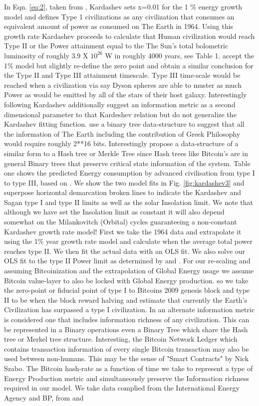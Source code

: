 \documentclass[final,5p,times,twocolumn,authoryear]{elsarticle}
\begin{document}
In Eqn. \ref{eq:2}, taken from \cite{kar64}, Kardashev sets x=0.01 for the 1 \% energy growth model and defines Type 1 civilizations as any civilization that consumes an equivalent amount of power as consumed on The Earth in 1964. Using  this growth rate Kardashev proceeds to calculate that Human civilization would reach Type II or the Power attainment equal to the The Sun's total bolometric luminosity of roughly 3.9 X $10^{26}$ W in roughly 4000 years, see Table 1.  \cite{sagan73} accept the 1\% model but slightly re-define the zero point and obtain a similar conclusion for the Type II and Type III attainment timescale. Type III time-scale would be reached when a civilization via say Dyson spheres are able to muster as much Power as would be emitted by all of the stars of their host galaxy. Interestingly \cite{sagan73} following Kardashev additionally suggest an information metric as a second dimensional parameter to that Kardeshev relation but do not generalize the Kardashev fitting function. \cite{sagan73} use a binary tree data-structure to suggest that all the information of The Earth including the contribution of Greek Philosophy would require roughly 2**16 bits. Interestingly \cite{sagan73} propose a data-structure of a similar form to a Hash tree or Merkle Tree since Hash trees like Bitcoin's are in general Binary trees that preserve critical state information of the system. Table one shows the predicted Energy consumption by advanced civilisation from type I to type III, based on \cite{kar64}. We show the two model fits in Fig. \ref{fig:kardashev3} and superpose horizontal demarcation broken lines to indicate the Kardashev and Sagan type I and type II limits as well as the solar Insolation limit. We note that although we have set the Insolation limit as constant it will also depend somewhat on the Milankovitch (Orbital) cycles guaranteeing a non-constant Kardashev growth rate model! First we take the 1964 data and extrapolate it using the 1\% year growth rate model and calculate when the average total power reaches type II. We then fit the actual data with an OLS fit. We also solve our OLS fit to the type II Power limit as determined by \cite{kar64} and \cite{sagan73}. For our re-scaling and assuming Bitcoinization and the extrapolation of Global Energy usage we assume Bitcoin value-layer to also be locked with Global Energy production. so we take the zero-point or fiducial point of type I to Bitcoins 2009 genesis block and type II to be when the block reward halving and estimate that currently the Earth's Civilization has surpassed a type I civilization. In \cite{sagan73} an alternate information metric is considered one that includes information richness of any civilization. This can be represented in a Binary operations even a Binary Tree which share the Hash tree or Merkel tree structure. Interesting, the Bitcoin Network Ledger which contains transaction information of every single Bitcoin transaction may also be used between non-humans. This may be the sense of "Smart Contracts" by Nick Szabo. The Bitcoin hash-rate as a function of time we take to represent a type of Energy Production metric and simultaneously preserve the Information richness required in our model. We take data complied from the International Energy Agency and BP, from \cite{owidenergy} and 
\end{document}

